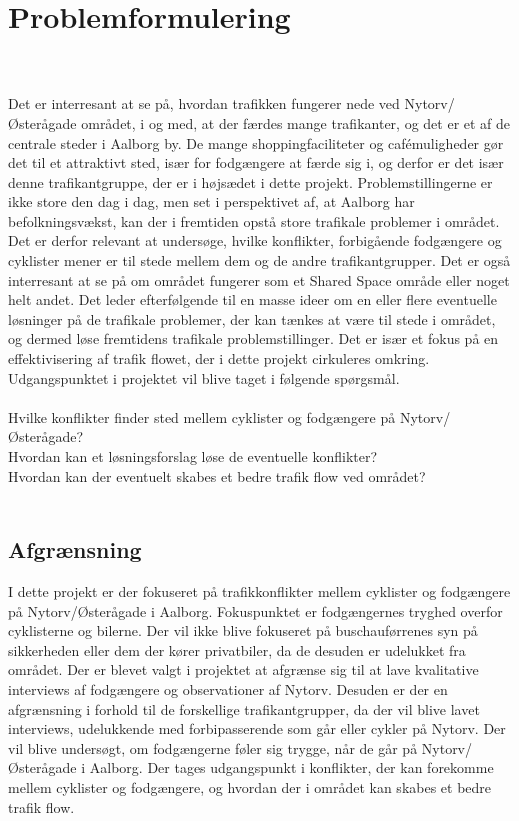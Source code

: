 \chapter{Problemformulering}
\label{chap:problemformulering}
~\\\\
Det er interresant at se på, hvordan trafikken fungerer nede ved Nytorv/Østerågade området, i og med, at der færdes mange trafikanter, og det er et af de centrale steder i Aalborg by. De mange shoppingfaciliteter og cafémuligheder gør det til et attraktivt sted, især for fodgængere at færde sig i, og derfor er det især denne trafikantgruppe, der er i højsædet i dette projekt. Problemstillingerne er ikke store den dag i dag, men set i perspektivet af, at Aalborg har befolkningsvækst, kan der i fremtiden opstå store trafikale problemer i området. Det er derfor relevant at undersøge, hvilke konflikter, forbigående fodgængere og cyklister mener er til stede mellem dem og de andre trafikantgrupper.
Det er også interresant at se på om området fungerer som et Shared Space område eller noget helt andet.
Det leder efterfølgende til en masse ideer om en eller flere eventuelle løsninger på de trafikale problemer, der kan tænkes at være til stede i området, og dermed løse fremtidens trafikale problemstillinger. Det er især et fokus på en effektivisering af trafik flowet, der i dette projekt cirkuleres omkring. Udgangspunktet i projektet vil blive taget i følgende spørgsmål.
\\\\
Hvilke konflikter finder sted mellem cyklister og fodgængere på Nytorv/Østerågade?
\\
Hvordan kan et løsningsforslag løse de eventuelle konflikter?
\\
Hvordan kan der eventuelt skabes et bedre trafik flow ved området?
\\\\

\section{Afgrænsning}
\label{sec:afgraensning}

I dette projekt er der fokuseret på trafikkonflikter mellem cyklister og fodgængere på Nytorv/Østerågade i Aalborg. Fokuspunktet er fodgængernes tryghed overfor cyklisterne og bilerne. Der vil ikke blive fokuseret på buschauførrenes syn på sikkerheden eller dem der kører privatbiler, da de desuden er udelukket fra området. Der er blevet valgt i projektet at afgrænse sig til at lave kvalitative interviews af fodgængere og observationer af Nytorv. Desuden er der en afgrænsning i forhold til de forskellige trafikantgrupper, da der vil blive lavet interviews, udelukkende med forbipasserende som går eller cykler på Nytorv. Der vil blive undersøgt, om fodgængerne føler sig trygge, når de går på Nytorv/Østerågade i Aalborg. Der tages udgangspunkt i konflikter, der kan forekomme mellem cyklister og fodgængere, og hvordan der i området kan skabes et bedre trafik flow.

